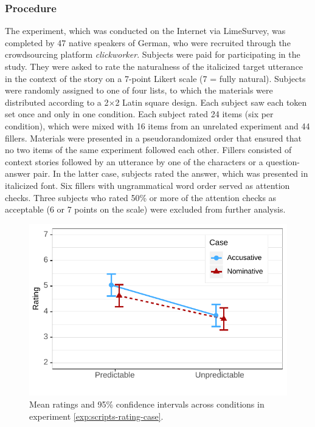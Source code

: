 \subsubsection{Procedure}
The experiment, which was conducted on the Internet via LimeSurvey, was completed by 47 native speakers of German, who were recruited through the crowdsourcing platform \textit{clickworker}. Subjects were paid  for participating in the study. They were asked to rate the naturalness of the italicized target utterance in the context of the story on a 7-point Likert scale (7 = fully natural). Subjects were randomly assigned to one of four lists, to which the materials were distributed according to a 2$\times$2 Latin square design. Each subject saw each token set once and only in one condition. Each subject rated 24 items (six per condition), which were mixed with 16 items from an unrelated experiment and 44 fillers. Materials were presented in a pseudorandomized order that ensured that no two items of the same experiment followed each other. Fillers consisted of context stories followed by an utterance by one of the characters or a question-answer pair. In the latter case, subjects rated the answer, which was presented in italicized font. Six fillers with ungrammatical word order served as attention checks. Three subjects who rated 50\% or more of the attention checks as acceptable (6 or 7 points on the scale) were excluded from further analysis.

\begin{figure}[t]
\includegraphics[scale=1]{figures/scripts_case_estimates}
\caption{Mean ratings and 95\% confidence intervals across conditions in experiment \ref{exp:scripts-rating-case}. \label{fig:scr-case-estimates}}
\end{figure}

